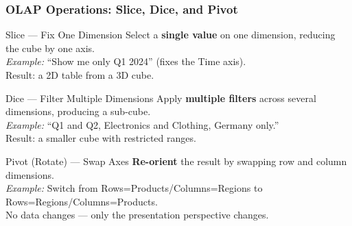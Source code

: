 \begin{frame}
  \frametitle{OLAP Operations: Slice, Dice, and Pivot}

  \begin{block}{Slice --- Fix One Dimension}
    Select a \textbf{single value} on one dimension, reducing the cube by one axis.\\
    \textit{Example:} ``Show me only Q1 2024'' (fixes the Time axis).\\
    Result: a 2D table from a 3D cube.
  \end{block}

  \begin{block}{Dice --- Filter Multiple Dimensions}
    Apply \textbf{multiple filters} across several dimensions, producing a sub-cube.\\
    \textit{Example:} ``Q1 and Q2, Electronics and Clothing, Germany only.''\\
    Result: a smaller cube with restricted ranges.
  \end{block}

  \begin{block}{Pivot (Rotate) --- Swap Axes}
    \textbf{Re-orient} the result by swapping row and column dimensions.\\
    \textit{Example:} Switch from Rows=Products/Columns=Regions
    to Rows=Regions/Columns=Products.\\
    No data changes --- only the presentation perspective changes.
  \end{block}
\end{frame}


